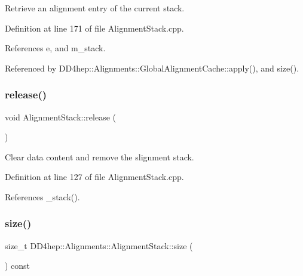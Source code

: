 Retrieve an alignment entry of the current stack. 



Definition at line 171 of file Alignment\+Stack.\+cpp.



References e, and m\+\_\+stack.



Referenced by D\+D4hep\+::\+Alignments\+::\+Global\+Alignment\+Cache\+::apply(), and size().

\hypertarget{class_d_d4hep_1_1_alignments_1_1_alignment_stack_aaf6353204aae5bda656bdda70d1161aa}{}\label{class_d_d4hep_1_1_alignments_1_1_alignment_stack_aaf6353204aae5bda656bdda70d1161aa} 
\subsubsection{\texorpdfstring{release()}{release()}}
{\footnotesize\ttfamily void Alignment\+Stack\+::release (\begin{DoxyParamCaption}{ }\end{DoxyParamCaption})}



Clear data content and remove the slignment stack. 



Definition at line 127 of file Alignment\+Stack.\+cpp.



References \+\_\+stack().

\hypertarget{class_d_d4hep_1_1_alignments_1_1_alignment_stack_a7329d94949d0105b0090cb5580bd59d0}{}\label{class_d_d4hep_1_1_alignments_1_1_alignment_stack_a7329d94949d0105b0090cb5580bd59d0} 
\subsubsection{\texorpdfstring{size()}{size()}}
{\footnotesize\ttfamily size\+\_\+t D\+D4hep\+::\+Alignments\+::\+Alignment\+Stack\+::size (\begin{DoxyParamCaption}{ }\end{DoxyParamCaption}) const\hspace{0.3cm}{\ttfamily [inline]}}



